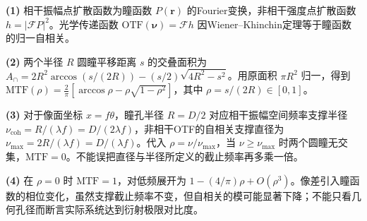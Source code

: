 \par\noindent\textbf{(1)} 相干振幅点扩散函数为瞳函数 \(P(\boldsymbol r)\) 的Fourier变换，非相干强度点扩散函数 \(h=|\mathcal F P|^2\)。光学传递函数 \(\mathrm{OTF}(\boldsymbol\nu)=\mathcal F h\) 因Wiener–Khinchin定理等于瞳函数的归一自相关。
\par\noindent\textbf{(2)} 两个半径 \(R\) 圆瞳平移距离 \(s\) 的交叠面积为 \(A_\cap=2R^2\arccos(s/(2R))-(s/2)\sqrt{4R^2-s^2}\)。用原面积 \(\pi R^2\) 归一，得到 \(\mathrm{MTF}(\rho)=\frac2\pi[\arccos\rho-\rho\sqrt{1-\rho^2}]\)，其中 \(\rho=s/(2R)\in[0,1]\)。
\par\noindent\textbf{(3)} 对于像面坐标 \(x=f\theta\)，瞳孔半径 \(R=D/2\) 对应相干振幅空间频率支撑半径 \(\nu_{\mathrm{coh}}=R/(\lambda f)=D/(2\lambda f)\)，非相干OTF的自相关支撑直径为 \(\nu_{\max}=2R/(\lambda f)=D/(\lambda f)\)。代入 \(\rho=\nu/\nu_{\max}\)，当 \(\nu\ge\nu_{\max}\) 时两个圆瞳无交集，\(\mathrm{MTF}=0\)。不能误把直径与半径所定义的截止频率再多乘一倍。
\par\noindent\textbf{(4)} 在 \(\rho=0\) 时 \(\mathrm{MTF}=1\)，对低频展开为 \(1-(4/\pi)\rho+O(\rho^3)\)。像差引入瞳函数的相位变化，虽然支撑截止频率不变，但自相关的模可能显著下降；不能只看几何孔径而断言实际系统达到衍射极限对比度。
